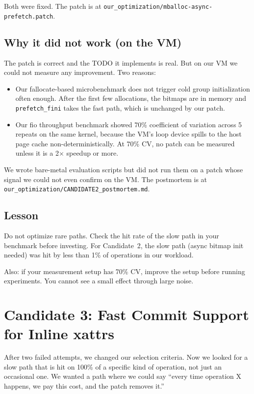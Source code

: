 \documentclass[11pt,a4paper]{article}
\begin{document}
Both were fixed. The patch is at
\texttt{our\_optimization/mballoc-async-prefetch.patch}.

\subsection{Why it did not work (on the VM)}

The patch is correct and the TODO it implements is real. But on our
VM we could not measure any improvement. Two reasons:
\begin{itemize}[leftmargin=*]
  \item Our fallocate-based microbenchmark does not trigger cold
        group initialization often enough. After the first few
        allocations, the bitmaps are in memory and
        \texttt{prefetch\_fini} takes the fast path, which is
        unchanged by our patch.
  \item Our fio throughput benchmark showed 70\% coefficient of
        variation across 5 repeats on the same kernel, because the
        VM's loop device spills to the host page cache
        non-deterministically. At 70\% CV, no patch can be measured
        unless it is a 2$\times$ speedup or more.
\end{itemize}

We wrote bare-metal evaluation scripts but did not run them on a
patch whose signal we could not even confirm on the VM. The
postmortem is at
\texttt{our\_optimization/CANDIDATE2\_postmortem.md}.

\subsection{Lesson}

Do not optimize rare paths. Check the hit rate of the slow path in
your benchmark before investing. For Candidate~2, the slow
path (async bitmap init needed) was hit by less than 1\% of
operations in our workload.

Also: if your measurement setup has 70\% CV, improve the setup
before running experiments. You cannot see a small effect through
large noise.

\section{Candidate 3: Fast Commit Support for Inline xattrs}

After two failed attempts, we changed our selection criteria. Now
we looked for a slow path that is hit on 100\% of a specific kind
of operation, not just an occasional one. We wanted a path where
we could say ``every time operation X happens, we pay this cost,
and the patch removes it.''
\end{document}
